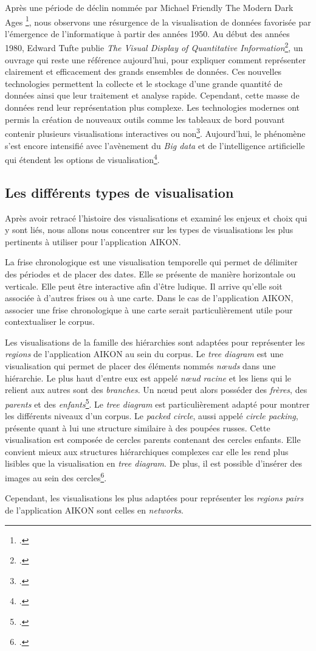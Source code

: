 Après une période de déclin nommée par Michael Friendly \og The Modern Dark Ages \fg\footcite{friendlyBriefHistoryData2008}, nous observons une résurgence de la visualisation de données favorisée par l'émergence de l'informatique à partir des années 1950. Au début des années 1980, Edward Tufte publie \textit{The Visual Display of Quantitative Information}\footcite{tufteVisualDisplayQuantitative1983}, un ouvrage qui reste une référence aujourd'hui, pour expliquer comment représenter clairement et efficacement des grands ensembles de données. Ces nouvelles technologies permettent la collecte et le stockage d'une grande quantité de données ainsi que leur traitement et analyse rapide. Cependant, cette masse de données rend leur représentation plus complexe. Les technologies modernes ont permis la création de nouveaux outils comme les tableaux de bord pouvant contenir plusieurs visualisations interactives ou non\footcite{insightsoftwareBreveHistoireVisualisation2023}. Aujourd'hui, le phénomène s'est encore intensifié avec l'avènement du \textit{Big data} et de l'intelligence artificielle qui étendent les options de visualisation\footcite{lagnelAvantPropos2021}.


\subsection{Les différents types de visualisation}

Après avoir retracé l'histoire des visualisations et examiné les enjeux et choix qui y sont liés, nous allons nous concentrer sur les types de visualisations les plus pertinents à utiliser pour l'application AIKON.


La frise chronologique est une visualisation temporelle qui permet de délimiter des périodes et de placer des dates. Elle se présente de manière horizontale ou verticale. Elle peut être interactive afin d'être ludique. Il arrive qu'elle soit associée à d'autres frises ou à une carte. 
Dans le cas de l'application AIKON, associer une frise chronologique à une carte serait particulièrement utile pour contextualiser le corpus.

Les visualisations de la famille des hiérarchies sont adaptées pour représenter les \textit{regions} de l'application AIKON au sein du corpus. 
Le \textit{tree diagram} est une visualisation qui permet de placer des éléments nommés \textit{nœuds} dans une hiérarchie. Le plus haut d'entre eux est appelé \textit{nœud racine} et les liens qui le relient aux autres sont des \textit{branches}. Un nœud peut alors posséder des \textit{frères}, des \textit{parents} et des \textit{enfants}\footcite{BlogDrawTree}. Le \textit{tree diagram} est particulièrement adapté pour montrer les différents niveaux d'un corpus. Le \textit{packed circle}, aussi appelé \textit{circle packing}, présente quant à lui une structure similaire à des poupées russes. Cette visualisation est composée de cercles parents contenant des cercles enfants.
Elle convient mieux aux structures hiérarchiques complexes car elle les rend plus lisibles que la visualisation en \textit{tree diagram}.
De plus, il est possible d'insérer des images au sein des cercles\footcite{lagnelGrandesFamillesRepresentations2021}.

Cependant, les visualisations les plus adaptées pour représenter les \textit{regions pairs} de l'application AIKON sont celles en \textit{networks}.

